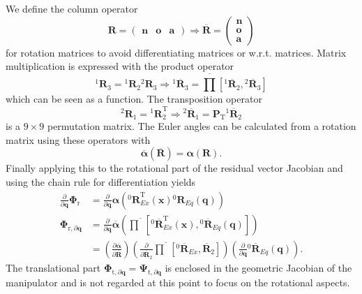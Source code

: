 \documentclass[twocolumn,10pt]{IFTOMM}
\newcommand{\bm}[1]{\boldsymbol{#1}}
\newcommand{\rotmat}[2]{{{ }^{#1}\boldsymbol{R}}_{#2}}
\newcommand{\rotmato}[2]{{{ }^{#1}\boldsymbol{\overline{R}}}_{#2}}
\newcommand{\transp}[0]{{\mathrm{T}}}
\begin{document}
We define the column operator
%
\begin{equation}
\bm{R}=\begin{pmatrix}
\bm{n} & \bm{o} & \bm{a}
\end{pmatrix}
\Rightarrow
\overline{\bm{R}}=\begin{pmatrix}
\bm{n} \\ \bm{o} \\ \bm{a}
\end{pmatrix}
\end{equation}
%
for rotation matrices to avoid differentiating matrices or w.r.t. matrices.
Matrix multiplication is expressed with the product operator
%
\begin{equation}
\rotmat{1}{3}
=
\rotmat{1}{2}
\rotmat{2}{3}
\Rightarrow
\rotmato{1}{3}
=
\overline{\prod}\left[ \rotmato{1}{2}, \rotmato{2}{3}\right]
\label{equ:matprod}
\end{equation}
%
which can be seen as a function. The transposition operator
%
\begin{equation}
\rotmat{2}{1}
=
\rotmat{1}{2}^\transp
\Rightarrow
\rotmato{2}{1}
=
\bm{P}_\transp \rotmato{1}{2}
\end{equation}
%
is a $9 \times 9$ permutation matrix.
The Euler angles can be calculated from a rotation matrix using these operators with
%
\begin{equation}
\overline{\bm{\alpha}}(\overline{\bm{R}})
=
\bm{\alpha}(\bm{R}).
\end{equation}
%
Finally applying this to the rotational part of the residual vector Jacobian and using the chain rule for differentiation yields
%
\begin{align}
\frac{\partial}{\partial \bm{q}}\bm{\Phi}_{\mathrm{r}}
&=
\frac{\partial}{\partial \bm{q}} \bm{\alpha}\left(\rotmat{0}{Ex}^\transp(\bm{x}) \rotmat{0}{Eq}(\bm{q})\right) \label{equ:grad_Phi_q}\\
\bm{\Phi}_{\mathrm{r},\partial\bm{q}}
&=
\frac{\partial}{\partial \bm{q}} \overline{\bm{\alpha}}\left(\overline{\prod}\left[ \rotmato{0}{Ex}^\transp(\bm{x}), \rotmato{0}{Eq}(\bm{q})\right]\right) \nonumber \\
&=
\left(\frac{\partial \overline{\bm{\alpha}}}{\partial \overline{\bm{R}}}\right)
\left(\frac{\partial }{\partial \overline{\bm{R}}_2}
\overline{\prod}\left[\rotmato{0}{Ex}, \overline{\bm{R}}_2\right]\right)
\left(\frac{\partial}{\partial \bm{q}} \rotmato{0}{Eq}(\bm{q})\right).  \nonumber
\end{align}
The translational part $\bm{\Phi}_{\mathrm{t},\partial\bm{q}}=\bm{\Psi}_{\mathrm{t},\partial\bm{q}}$ is enclosed in the geometric Jacobian of the manipulator and is not regarded at this point to focus on the rotational aspects.
\end{document}
